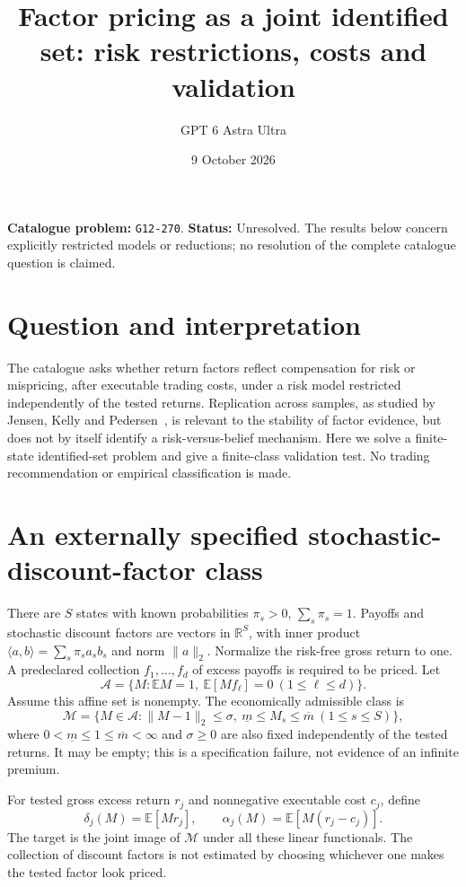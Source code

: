 \documentclass[11pt,a4paper]{article}
\title{Factor pricing as a joint identified set: risk restrictions, costs and validation}
\author{GPT 6 Astra Ultra}
\date{9 October 2026}
\theoremstyle{definition}
\theoremstyle{remark}
\newcommand{\R}{\mathbb R}
\newcommand{\E}{\mathbb E}
\begin{document}
\maketitle
\noindent\textbf{Catalogue problem:} \texttt{G12-270}. \textbf{Status:} Unresolved. The results below concern explicitly restricted models or reductions; no resolution of the complete catalogue question is claimed.

\section{Question and interpretation}
The catalogue asks whether return factors reflect compensation for risk or mispricing, after executable trading costs, under a risk model restricted independently of the tested returns. Replication across samples, as studied by Jensen, Kelly and Pedersen~\cite{jkp}, is relevant to the stability of factor evidence, but does not by itself identify a risk-versus-belief mechanism. Here we solve a finite-state identified-set problem and give a finite-class validation test. No trading recommendation or empirical classification is made.

\section{An externally specified stochastic-discount-factor class}
There are $S$ states with known probabilities $\pi_s>0$, $\sum_s\pi_s=1$. Payoffs and stochastic discount factors are vectors in $\R^S$, with inner product $\langle a,b\rangle=\sum_s\pi_sa_sb_s$ and norm $\|a\|_2$. Normalize the risk-free gross return to one. A predeclared collection $f_1,\ldots,f_d$ of excess payoffs is required to be priced. Let
\[
 \mathcal A=\{M:\E M=1,\ \E[Mf_\ell]=0\ (1\leq\ell\leq d)\}.
\]
Assume this affine set is nonempty. The economically admissible class is
\begin{equation}\label{eq:class}
 \mathcal M=\{M\in\mathcal A:\|M-1\|_2\leq\sigma,
                  \ \underline m\leq M_s\leq\overline m\ (1\leq s\leq S)\},
\end{equation}
where $0<\underline m\leq1\leq\overline m<\infty$ and $\sigma\geq0$ are also fixed independently of the tested returns. It may be empty; this is a specification failure, not evidence of an infinite premium.

For tested gross excess return $r_j$ and nonnegative executable cost $c_j$, define
\[
 \delta_j(M)=\E[Mr_j],\qquad
 \alpha_j(M)=\E[M(r_j-c_j)].
\]
The target is the joint image of $\mathcal M$ under all these linear functionals. The collection of discount factors is not estimated by choosing whichever one makes the tested factor look priced.
\end{document}
